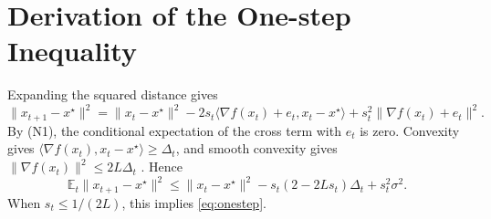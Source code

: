 \documentclass[11pt]{article}
\newcommand{\E}{\mathbb{E}}
\begin{document}
\appendix
\section{Derivation of the One-step Inequality}\label{app:sgd}

Expanding the squared distance gives
\[
\|x_{t+1}-x^\star\|^2=\|x_t-x^\star\|^2-2s_t\langle\nabla f(x_t)+e_t,x_t-x^\star\rangle+s_t^2\|\nabla f(x_t)+e_t\|^2.
\]
By (N1), the conditional expectation of the cross term with $e_t$ is zero. Convexity gives $\langle\nabla f(x_t),x_t-x^\star\rangle\ge\Delta_t$, and smooth convexity gives $\|\nabla f(x_t)\|^2\le2L\Delta_t$ \citep[Theorem~2.1.5]{nesterov2004}. Hence
\[
\E_t\|x_{t+1}-x^\star\|^2\le\|x_t-x^\star\|^2-s_t(2-2Ls_t)\Delta_t+s_t^2\sigma^2.
\]
When $s_t\le1/(2L)$, this implies \eqref{eq:onestep}.



\end{document}

